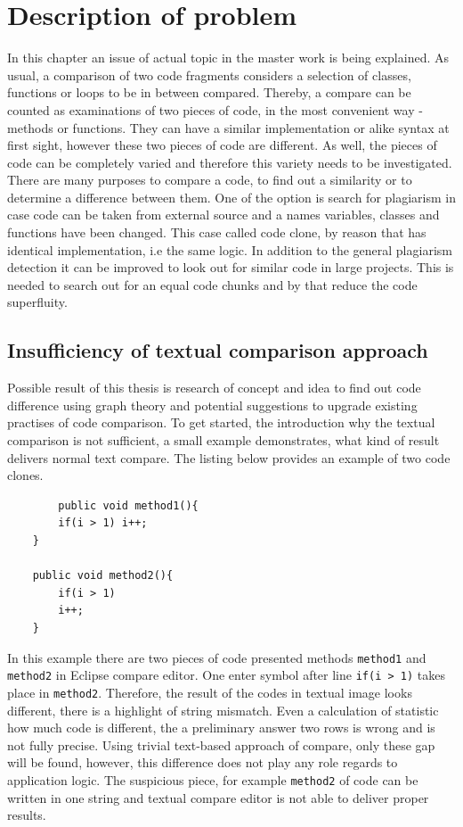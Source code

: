 \documentclass{report}
\begin{document}
\chapter{Description of problem}
\label{cha:Description}
In this chapter an issue of actual topic in the master work is being explained. As usual, a comparison of two code fragments considers a selection of classes, functions or loops to be in between compared. Thereby, a compare can be counted as examinations of two pieces of code, in the most convenient way - methods or functions. They can have a similar implementation or alike syntax at first sight, however these two pieces of code are different. As well, the pieces of code can be completely varied and therefore this variety needs to be investigated. 
\\
There are many purposes to compare a code, to find out a similarity or to determine a difference between them. One of the option is search for plagiarism in case code can be taken from external source and a names variables, classes and functions have been changed. This case called code clone, by reason that has identical implementation, i.e the same logic. In addition to the general plagiarism detection it can be improved to look out for similar code in large projects. This is needed to search out for an equal code chunks and by that reduce the code superfluity.

\section{Insufficiency of textual comparison approach}
Possible result of this thesis is research of concept and idea to find out code difference using graph theory and potential suggestions to upgrade existing practises of code comparison. To get started, the introduction why the textual comparison is not sufficient, a small example demonstrates, what kind of result delivers normal text compare. The listing below provides an example of two code clones.

 \newpage
\begin{lstlisting}
		public void method1(){
		if(i > 1) i++;
	}
	
	public void method2(){
		if(i > 1) 
		i++;
	}

\end{lstlisting}
	
In this example there are two pieces of code presented methods \texttt{method1} and \texttt{method2} in Eclipse compare editor. One enter symbol after line \texttt{if(i > 1)} takes place in \texttt{method2}. Therefore, the result of the codes in textual image looks different, there is a highlight of string mismatch. Even a calculation of statistic how much code is different, the a preliminary answer two rows is wrong and is not fully precise.
Using trivial text-based approach of compare, only these gap will be found, however, this difference does not play any role regards to application logic. The suspicious piece, for example \texttt{method2} of code can be written in one string and textual compare editor is not able to deliver proper results.
\end{document}
